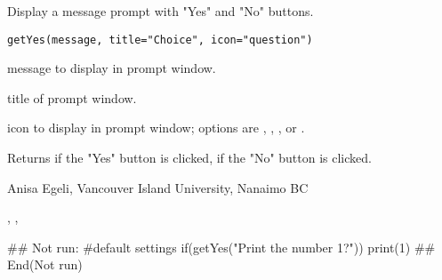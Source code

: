 \documentclass[letterpaper]{book}
\begin{document}
\begin{Description}\relax
Display a message prompt with "Yes" and "No" buttons.
\end{Description}
\begin{Usage}
\begin{verbatim}
getYes(message, title="Choice", icon="question")
\end{verbatim}
\end{Usage}
\begin{Arguments}
\begin{ldescription}
\item[\code{message}] message to display in prompt window.
\item[\code{title}] title of prompt window.
\item[\code{icon}] icon to display in prompt window; options are 
, , , or .
\end{ldescription}
\end{Arguments}
\begin{Value}
Returns  if the "Yes" button is clicked,  if the "No" button is clicked.
\end{Value}
\begin{Author}\relax
Anisa Egeli, Vancouver Island University, Nanaimo BC
\end{Author}
\begin{SeeAlso}\relax
{}, , 
\end{SeeAlso}
\begin{Examples}
\begin{ExampleCode}
## Not run: 
#default settings
if(getYes("Print the number 1?"))
        print(1)
## End(Not run)
\end{ExampleCode}
\end{Examples}
\end{document}
